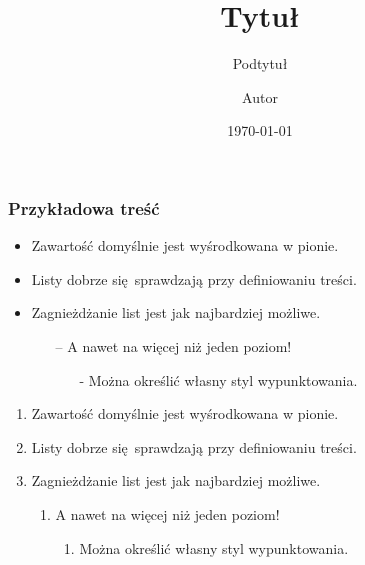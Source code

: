 \documentclass[4:3,pl,v2]{template-PWr/presentation}
\title{Tytuł}
\subtitle{Podtytuł}
\author{Autor}
\institute{Jednostka}
\date{\today}
\begin{document}
    \begin{frame}

        \titlepage{}
    \end{frame}


    \begin{frame}
        \frametitle{Przykładowa treść}
        \footnotesize

        \begin{itemize}
            \setlength{\itemsep}{0.5em}
            \item Zawartość domyślnie jest wyśrodkowana w pionie.
            \item Listy dobrze się sprawdzają przy definiowaniu treści.
            \item Zagnieżdżanie list jest jak najbardziej możliwe.
                  \begin{itemize}
                      \item[--] A nawet na więcej niż jeden poziom!
                                \begin{itemize}
                                    \item[-] Można określić własny styl wypunktowania.
                                \end{itemize}
                  \end{itemize}
        \end{itemize}

        \vfill

        \begin{enumerate}
            \setlength{\itemsep}{0.5em}
            \item Zawartość domyślnie jest wyśrodkowana w pionie.
            \item Listy dobrze się sprawdzają przy definiowaniu treści.
            \item Zagnieżdżanie list jest jak najbardziej możliwe.
                  \begin{enumerate}
                      \item A nawet na więcej niż jeden poziom!
                            \begin{enumerate}
                                \item Można określić własny styl wypunktowania.
                            \end{enumerate}
                  \end{enumerate}
        \end{enumerate}
    \end{frame}
\end{document}
